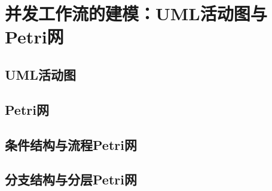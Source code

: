 \documentclass[index]{subfiles}
\begin{document}
\chapter{并发工作流的建模：UML活动图与Petri网}
\section{UML活动图}
\section{Petri网}
\section{条件结构与流程Petri网}
\section{分支结构与分层Petri网}
\end{document}
